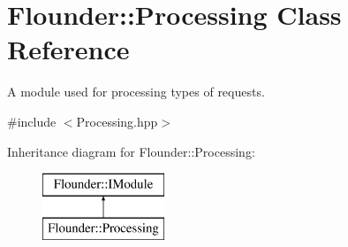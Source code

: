 \hypertarget{class_flounder_1_1_processing}{}\section{Flounder\+:\+:Processing Class Reference}
\label{class_flounder_1_1_processing}


A module used for processing types of requests.  




{\ttfamily \#include $<$Processing.\+hpp$>$}

Inheritance diagram for Flounder\+:\+:Processing\+:\begin{figure}[H]
\begin{center}
\leavevmode
\includegraphics[height=2.000000cm]{class_flounder_1_1_processing}
\end{center}
\end{figure}
